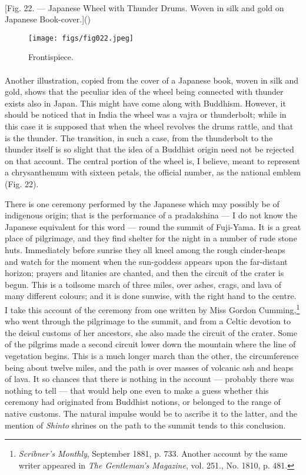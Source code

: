 \documentclass[a4paper, 11pt, oneside, polutonikogreek, english]{article}
\begin{document}
\paragraph{}
[Fig. 22. --- Japanese Wheel with Thunder Drums. Woven in silk and gold on Japanese Book-cover.]()
\begin{figure}[H]
\centering
\texttt{[image: figs/fig022.jpeg]}
\caption{Frontispiece.}
\end{figure}
\paragraph{}
Another illustration, copied from the cover of a Japanese book, woven in silk and gold, shows that the peculiar idea of the wheel being connected with thunder exists also in Japan. This might have come along with Buddhism. However, it should be noticed that in India the wheel was a vajra or thunderbolt; while in this case it is supposed that when the wheel revolves the drums rattle, and that is the thunder. The transition, in such a case, from the thunderbolt to the thunder itself is so slight that the idea of a Buddhist origin need not be rejected on that account. The central portion of the wheel is, I believe, meant to represent a chrysanthemum with sixteen petals, the official number, as the national emblem (Fig. 22).

There is one ceremony performed by the Japanese which may possibly be of indigenous origin; that is the performance of a pradakshina --- I do not know the Japanese equivalent for this word --- round the summit of Fuji-Yama. It is a great place of pilgrimage, and they find shelter for the night in a number of rude stone huts. Immediately before sunrise they all kneel among the rough cinder-heaps and watch for the moment when the sun-goddess appears upon the far-distant horizon; prayers and litanies are chanted, and then the circuit of the crater is begun. This is a toilsome march of three miles, over ashes, crags, and lava of many different colours; and it is done sunwise, with the right hand to the centre. I take this account of the ceremony from one written by Miss Gordon Cumming,\footnote{\emph{Scribner's Monthly}, September 1881, p. 733. Another account by the same writer appeared in \emph{The Gentleman's Magazine}, vol. 251., No. 1810, p. 481.} who went through the pilgrimage to the summit, and from a Celtic devotion to the deisul customs of her ancestors, she also made the circuit of the crater. Some of the pilgrims made a second circuit lower down the mountain where the line of vegetation begins. This is a much longer march than the other, the circumference being about twelve miles, and the path is over masses of volcanic ash and heaps of lava. It so chances that there is nothing in the account --- probably there was nothing to tell --- that would help one even to make a guess whether this ceremony had originated from Buddhist notions, or belonged to the range of native customs. The natural impulse would be to ascribe it to the latter, and the mention of \emph{Shinto} shrines on the path to the summit tends to this conclusion.
\clearpage
\end{document}
